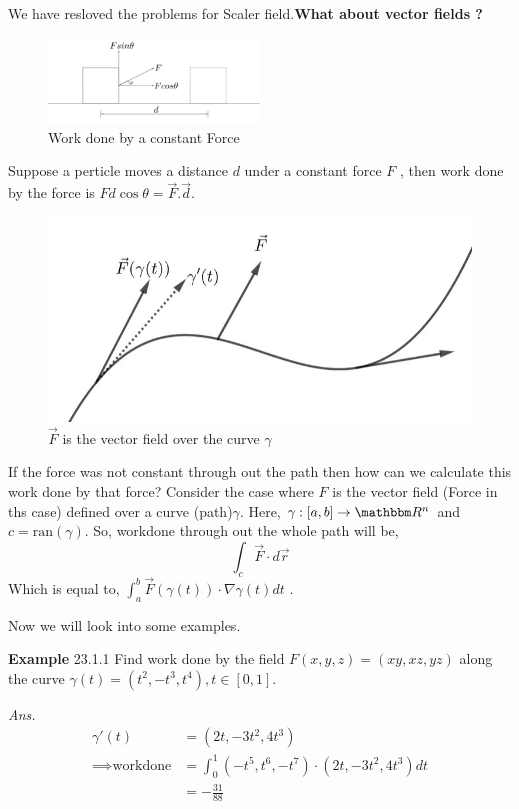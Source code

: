 \documentclass[Analysis-3]{subfiles}
\begin{document}
We have resloved the problems for Scaler field.\textbf{What about vector fields ?} 
\begin{figure}[H]
    \centering
    \includegraphics[width=0.5\textwidth]{figures/lec-23.2.png}
    \caption{Work done by a constant Force}
\end{figure}
 Suppose a perticle moves a distance $d$ under a constant force $F$ , then work done by the force is $Fd\cos \theta = \vec{F}.\vec{d}$.


 \begin{figure}
    \centering
    \includegraphics[width=.98\linewidth]{figures/lec-23.3.png}
    \caption{$\vec{F}$ is the vector field over the curve $\gamma$}
\end{figure}

If the force was not constant through out the path then how can we calculate this work done by that force? 
Consider the case where $F$ is the vector field (Force in ths case) defined over a curve (path)$\gamma$. Here, $\gamma : [a,b] \to \R^n$ and $c = \text{ran}(\gamma)$. So, workdone through out the whole path will be, 
\[\int_c \vec{F}\cdot d\vec{r}\] 
Which is equal to, $\int_a^b \vec{F}(\gamma(t))\cdot \nabla \gamma(t) dt$ .

Now we will look into some examples.
\vspace{0.3cm}

\textbf{Example} 23.1.1  Find work done by the field $F(x,y,z) = (xy,xz,yz)$ along the curve $\gamma(t) = (t^2,-t^3,t^4),t \in [0,1]$.

\textit{Ans.} \begin{align*}
    \gamma'(t) &= (2t,-3t^2,4t^3) \\
    \implies \text{workdone} &= \int_0^1 (-t^5,t^6,-t^7)\cdot(2t,-3t^2,4t^3) dt \\
    &= -\frac{31}{88}
\end{align*}
\end{document}
